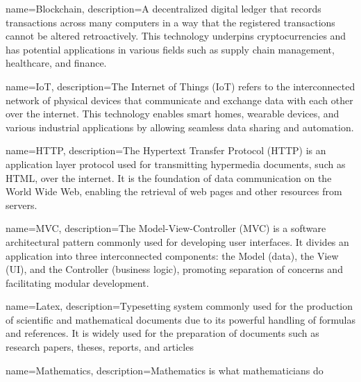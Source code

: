 

{
    name=Blockchain,
    description={A decentralized digital ledger that records transactions across many computers in a way that the registered transactions cannot be altered retroactively. This technology underpins cryptocurrencies and has potential applications in various fields such as supply chain management, healthcare, and finance.}
}

{
    name=IoT,
    description={The Internet of Things (IoT) refers to the interconnected network of physical devices that communicate and exchange data with each other over the internet. This technology enables smart homes, wearable devices, and various industrial applications by allowing seamless data sharing and automation.}
}

{
    name=HTTP,
    description={The Hypertext Transfer Protocol (HTTP) is an application layer protocol used for transmitting hypermedia documents, such as HTML, over the internet. It is the foundation of data communication on the World Wide Web, enabling the retrieval of web pages and other resources from servers.}
}

{
    name=MVC,
    description={The Model-View-Controller (MVC) is a software architectural pattern commonly used for developing user interfaces. It divides an application into three interconnected components: the Model (data), the View (UI), and the Controller (business logic), promoting separation of concerns and facilitating modular development.}
}

{
    name=Latex,
    description={Typesetting system commonly used for the production of scientific and mathematical documents due to its powerful handling of formulas and references. It is widely used for the preparation of documents such as research papers, theses, reports, and articles}
}

{
    name=Mathematics,
    description={Mathematics is what mathematicians do}
}
